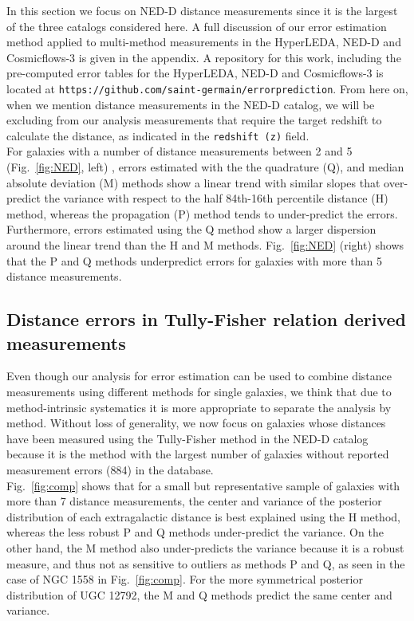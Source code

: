 \documentclass[a4paper,fleqn,usenatbib]{mnras}
\begin{document}
In this section we focus on NED-D distance measurements since it is the largest of the three catalogs considered here. A full discussion of our error estimation method applied to multi-method measurements in the HyperLEDA, NED-D and Cosmicflows-3 is given in the appendix. A repository for this work, including the pre-computed error tables for the HyperLEDA, NED-D and Cosmicflows-3 is located at \texttt{https://github.com/saint-germain/errorprediction}. From here on, when we mention distance measurements in the NED-D catalog, we will be excluding from our analysis measurements that require the target redshift to calculate the distance, as indicated in the \texttt{redshift (z)} field.\\

For galaxies with a number of distance measurements between 2 and 5 (Fig.~\ref{fig:NED}, left) , errors estimated with the the quadrature (Q), and median absolute deviation (M) methods show a linear trend with similar slopes that over-predict the variance with respect to the half 84th-16th percentile distance (H) method, whereas the propagation (P) method tends to under-predict the errors. Furthermore, errors estimated using the Q method show a larger dispersion around the linear trend than the H and M methods. Fig.~\ref{fig:NED} (right) shows that the P and Q methods underpredict errors for galaxies with more than 5 distance measurements. 

\subsection{Distance errors in Tully-Fisher relation derived measurements}

Even though our analysis for error estimation can be used to combine distance measurements using different methods for single galaxies, we think that due to method-intrinsic systematics it is more appropriate to separate the analysis by method. Without loss of generality, we now focus on galaxies whose distances have been measured using the Tully-Fisher method in the NED-D catalog because it is the method with the largest number of galaxies without reported measurement errors (884) in the database.  \\

Fig.~\ref{fig:comp} shows that for a small but representative sample of galaxies with more than 7 distance measurements, the center and variance of the posterior distribution of each extragalactic distance is best explained using the H method, whereas the less robust P and Q methods under-predict the variance. On the other hand, the M method also under-predicts the variance because it is a robust measure, and thus not as sensitive to outliers as methods P and Q, as seen in the case of NGC 1558 in Fig.~\ref{fig:comp}. For the more symmetrical posterior distribution of UGC 12792, the M and Q methods predict the same center and variance.\\
\end{document}
